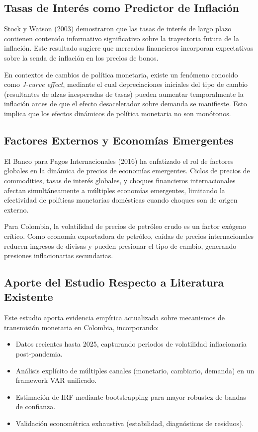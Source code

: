 \documentclass[12pt,a4paper]{article}
\begin{document}
\subsection{Tasas de Interés como Predictor de Inflación}

Stock y Watson (2003) demostraron que las tasas de interés de largo plazo contienen contenido informativo significativo sobre la trayectoria futura de la inflación. Este resultado sugiere que mercados financieros incorporan expectativas sobre la senda de inflación en los precios de bonos.

En contextos de cambios de política monetaria, existe un fenómeno conocido como \textit{J-curve effect}, mediante el cual depreciaciones iniciales del tipo de cambio (resultantes de alzas inesperadas de tasas) pueden aumentar temporalmente la inflación antes de que el efecto desacelerador sobre demanda se manifieste. Esto implica que los efectos dinámicos de política monetaria no son monótonos.

\subsection{Factores Externos y Economías Emergentes}

El Banco para Pagos Internacionales (2016) ha enfatizado el rol de factores globales en la dinámica de precios de economías emergentes. Ciclos de precios de commodities, tasas de interés globales, y choques financieros internacionales afectan simultáneamente a múltiples economías emergentes, limitando la efectividad de políticas monetarias domésticas cuando choques son de origen externo.

Para Colombia, la volatilidad de precios de petróleo crudo es un factor exógeno crítico. Como economía exportadora de petróleo, caídas de precios internacionales reducen ingresos de divisas y pueden presionar el tipo de cambio, generando presiones inflacionarias secundarias.

\subsection{Aporte del Estudio Respecto a Literatura Existente}

Este estudio aporta evidencia empírica actualizada sobre mecanismos de transmisión monetaria en Colombia, incorporando:

\begin{itemize}
\item Datos recientes hasta 2025, capturando periodos de volatilidad inflacionaria post-pandemia.
\item Análisis explícito de múltiples canales (monetario, cambiario, demanda) en un framework VAR unificado.
\item Estimación de IRF mediante bootstrapping para mayor robustez de bandas de confianza.
\item Validación econométrica exhaustiva (estabilidad, diagnósticos de residuos).
\end{itemize}
\end{document}
